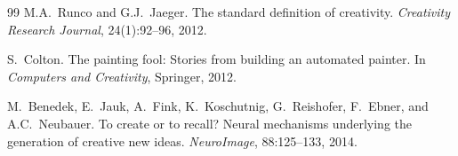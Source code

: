 \documentclass[11pt,a4paper]{article}
\begin{document}
\begin{thebibliography}{99}
M.A.~Runco and G.J.~Jaeger.
\newblock The standard definition of creativity.
\newblock \textit{Creativity Research Journal}, 24(1):92--96, 2012.

S.~Colton.
\newblock The painting fool: Stories from building an automated painter.
\newblock In \textit{Computers and Creativity}, Springer, 2012.

M.~Benedek, E.~Jauk, A.~Fink, K.~Koschutnig, G.~Reishofer, F.~Ebner, and A.C.~Neubauer.
\newblock To create or to recall? Neural mechanisms underlying the generation of creative new ideas.
\newblock \textit{NeuroImage}, 88:125--133, 2014.

\end{thebibliography}
\end{document}
